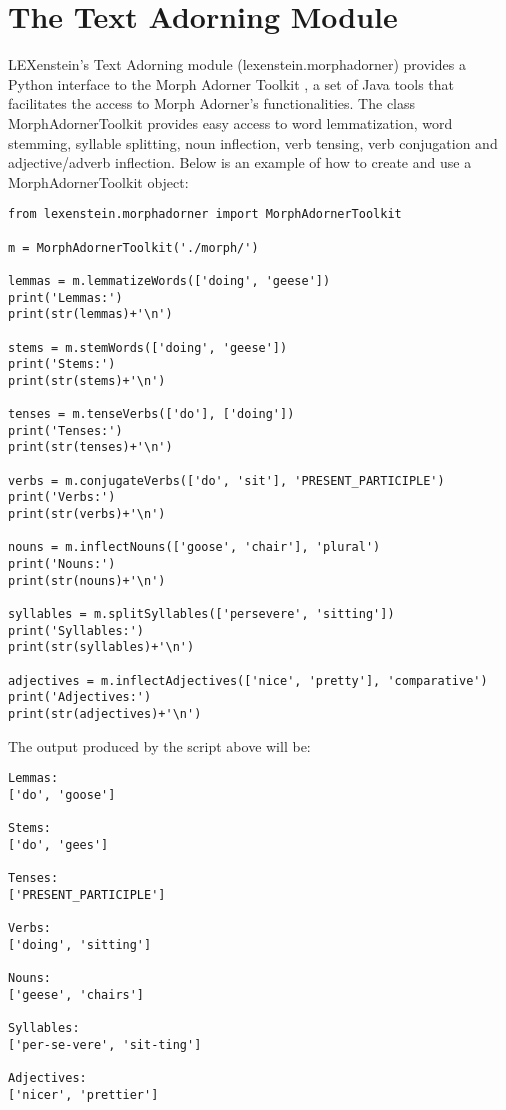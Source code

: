\chapter{The Text Adorning Module}
\label{adorning}

LEXenstein's Text Adorning module (lexenstein.morphadorner) provides a Python interface to the Morph Adorner Toolkit \cite{Paetzold15mat}, a set of Java tools that facilitates the access to Morph Adorner's functionalities. The class MorphAdornerToolkit provides easy access to word lemmatization, word stemming, syllable splitting, noun inflection, verb tensing, verb conjugation and adjective/adverb inflection. Below is an example of how to create and use a MorphAdornerToolkit object:

\begin{lstlisting}
from lexenstein.morphadorner import MorphAdornerToolkit

m = MorphAdornerToolkit('./morph/')

lemmas = m.lemmatizeWords(['doing', 'geese'])
print('Lemmas:')
print(str(lemmas)+'\n')

stems = m.stemWords(['doing', 'geese'])
print('Stems:')
print(str(stems)+'\n')

tenses = m.tenseVerbs(['do'], ['doing'])
print('Tenses:')
print(str(tenses)+'\n')

verbs = m.conjugateVerbs(['do', 'sit'], 'PRESENT_PARTICIPLE')
print('Verbs:')
print(str(verbs)+'\n')

nouns = m.inflectNouns(['goose', 'chair'], 'plural')
print('Nouns:')
print(str(nouns)+'\n')

syllables = m.splitSyllables(['persevere', 'sitting'])
print('Syllables:')
print(str(syllables)+'\n')

adjectives = m.inflectAdjectives(['nice', 'pretty'], 'comparative')
print('Adjectives:')
print(str(adjectives)+'\n')
\end{lstlisting}

The output produced by the script above will be:

\begin{lstlisting}
Lemmas:
['do', 'goose']

Stems:
['do', 'gees']

Tenses:
['PRESENT_PARTICIPLE']

Verbs:
['doing', 'sitting']

Nouns:
['geese', 'chairs']

Syllables:
['per-se-vere', 'sit-ting']

Adjectives:
['nicer', 'prettier']
\end{lstlisting}